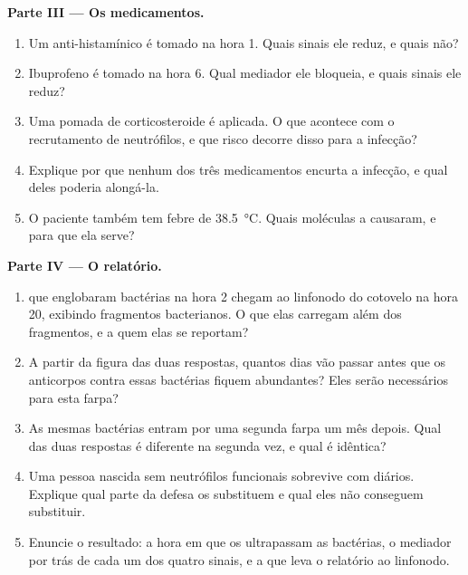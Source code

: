 \begin{problem}
\medskip
\noindent\textbf{Parte III --- Os medicamentos.}
\begin{enumerate}[resume]
  \item Um anti-histamínico é tomado na hora 1. Quais sinais ele
        reduz, e quais não?
  \item Ibuprofeno é tomado na hora 6. Qual mediador ele bloqueia, e
        quais sinais ele reduz?
  \item Uma pomada de corticosteroide é aplicada. O que acontece com o
        recrutamento de neutrófilos, e que risco decorre disso para a
        infecção?
  \item Explique por que nenhum dos três medicamentos encurta a
        infecção, e qual deles poderia alongá-la.
  \item O paciente também tem febre de \qty{38.5}{\celsius}. Quais
        moléculas a causaram, e para que ela serve?
\end{enumerate}

\medskip
\noindent\textbf{Parte IV --- O relatório.}
\begin{enumerate}[resume]
  \item {} que englobaram bactérias na hora 2 chegam
        ao linfonodo do cotovelo na hora 20, exibindo fragmentos
        bacterianos. O que elas carregam além dos fragmentos, e a quem
        elas se reportam?
  \item A partir da figura das duas respostas, quantos dias vão passar
        antes que os anticorpos contra essas bactérias fiquem
        abundantes? Eles serão necessários para esta farpa?
  \item As mesmas bactérias entram por uma segunda farpa um mês depois.
        Qual das duas respostas é diferente na segunda vez, e qual é
        idêntica?
  \item Uma pessoa nascida sem neutrófilos funcionais sobrevive com
         diários. Explique qual parte da defesa os
         substituem e qual eles não conseguem substituir.
  \item Enuncie o resultado: a hora em que os  ultrapassam as
        bactérias, o mediador por trás de cada um dos quatro sinais, e
        a  que leva o relatório ao linfonodo.
\end{enumerate}
\end{problem}
